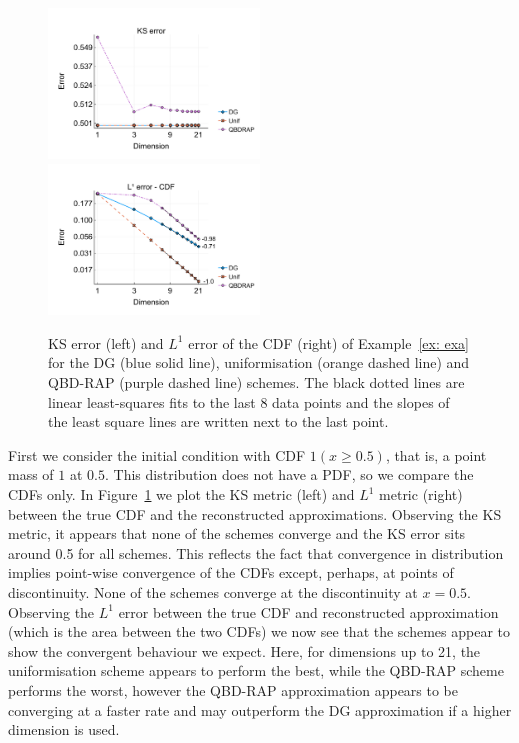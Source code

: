 \begin{example}\label{ex: exa}
	\begin{figure}[h]
		\centering
		\includegraphics[width=0.5\textwidth,trim={0.5cm 0.8cm 0.2cm 1.25cm},clip]{chapter6/figs/comp/fun1/meshs_ks_error_formatted.pdf}%
		\includegraphics[width=0.5\textwidth,trim={0.5cm 0.8cm 0.2cm 1.25cm},clip]{chapter6/figs/comp/fun1/meshs_l1_cdf_error_formatted.pdf}
		\caption{KS error (left) and \(L^1\) error of the CDF (right) of Example~\ref{ex: exa} for the DG (blue solid line), uniformisation (orange dashed line) and QBD-RAP (purple dashed line) schemes. The black dotted lines are linear least-squares fits to the last 8 data points and the slopes of the least square lines are written next to the last point.}
		\label{fig: fun 1 comp} 
	\end{figure} 
	First we consider the initial condition with CDF \(1(x\geq 0.5)\), that is, a point mass of \(1\) at \(0.5\). This distribution does not have a PDF, so we compare the CDFs only. In Figure~\ref{fig: fun 1 comp} we plot the KS metric (left) and \(L^1\) metric (right) between the true CDF and the reconstructed approximations. Observing the KS metric, it appears that none of the schemes converge and the KS error sits around 0.5 for all schemes. This reflects the fact that convergence in distribution implies point-wise convergence of the CDFs except, perhaps, at points of discontinuity. None of the schemes converge at the discontinuity at \(x=0.5\). Observing the \(L^1\) error between the true CDF and reconstructed approximation (which is the area between the two CDFs) we now see that the schemes appear to show the convergent behaviour we expect. Here, for dimensions up to 21, the uniformisation scheme appears to perform the best, while the QBD-RAP scheme performs the worst, however the QBD-RAP approximation appears to be converging at a faster rate and may outperform the DG approximation if a higher dimension is used.


\end{example}
